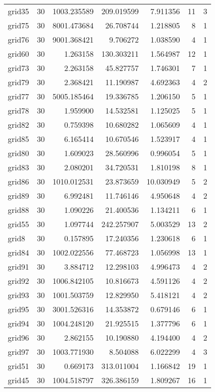 \begin{longtable}{|l|r|r|r|r|r|r|}
grid35 & 30 & 1003.235589 & 209.019599 & 7.911356 & 11 & 3 \\
grid75 & 30 & 8001.473684 & 26.708744 & 1.218805 & 8 & 1 \\
grid76 & 30 & 9001.368421 & 9.706272 & 1.038590 & 4 & 1 \\
grid60 & 30 & 1.263158 & 130.303211 & 1.564987 & 12 & 1 \\
grid73 & 30 & 2.263158 & 45.827757 & 1.746301 & 7 & 1 \\
grid79 & 30 & 2.368421 & 11.190987 & 4.692363 & 4 & 2 \\
grid77 & 30 & 5005.185464 & 19.336785 & 1.206150 & 5 & 1 \\
grid78 & 30 & 1.959900 & 14.532581 & 1.125025 & 5 & 1 \\
grid82 & 30 & 0.759398 & 10.680282 & 1.065609 & 4 & 1 \\
grid85 & 30 & 6.165414 & 10.670546 & 1.523917 & 4 & 1 \\
grid80 & 30 & 1.609023 & 28.560996 & 0.996054 & 5 & 1 \\
grid83 & 30 & 2.080201 & 34.720531 & 1.810198 & 8 & 1 \\
grid86 & 30 & 1010.012531 & 23.873659 & 10.030949 & 5 & 2 \\
grid89 & 30 & 6.992481 & 11.746146 & 4.950648 & 4 & 2 \\
grid88 & 30 & 1.090226 & 21.400536 & 1.134211 & 6 & 1 \\
grid55 & 30 & 1.097744 & 242.257907 & 5.003529 & 13 & 2 \\
grid8 & 30 & 0.157895 & 17.240356 & 1.230618 & 6 & 1 \\
grid84 & 30 & 1002.022556 & 77.468723 & 1.056998 & 13 & 1 \\
grid91 & 30 & 3.884712 & 12.298103 & 4.996473 & 4 & 2 \\
grid92 & 30 & 1006.842105 & 10.816673 & 4.591126 & 4 & 2 \\
grid93 & 30 & 1001.503759 & 12.829950 & 5.418121 & 4 & 2 \\
grid95 & 30 & 3001.526316 & 14.353872 & 0.679146 & 6 & 1 \\
grid94 & 30 & 1004.248120 & 21.925515 & 1.377796 & 6 & 1 \\
grid96 & 30 & 2.862155 & 10.190880 & 4.194400 & 4 & 2 \\
grid97 & 30 & 1003.771930 & 8.504088 & 6.022299 & 4 & 3 \\
grid51 & 30 & 0.669173 & 313.011004 & 1.166842 & 19 & 1 \\
grid45 & 30 & 1004.518797 & 326.386159 & 1.809267 & 16 & 1 \\

\end{longtable}
